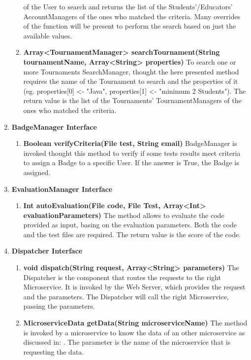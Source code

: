 \begin{enumerate}
\begin{enumerate}[label=$\bullet$]
            of the User to search and returns the list of the Students'/Educators' AccountManagers of the ones who matched the criteria. Many overrides of the function will be present to perform the search based on just the available values.
            \item \textbf{Array<TournamentManager> searchTournament(String tournamentName, Array<String> properties)} To search one or more Tournaments SearchManager, thought the here presented method requires the name of the Tournament 
            to search and the properties of it (eg. properties[0] <- "Java", properties[1] <- "minimum 2 Students"). The return value is the list of the Tournaments' TournamentManagers of the ones who matched the criteria.
        \end{enumerate}
    \item \textbf{BadgeManager Interface}
        \begin{enumerate}[label=$\bullet$]
            \item \textbf{Boolean verifyCriteria(File test, String email)} BadgeManager is invoked thought this method to verify if some tests results meet criteria to assign a Badge to a specific User. If the answer is True, the Badge
            is assigned.
        \end{enumerate}
    \item \textbf{EvaluationManager Interface}
        \begin{enumerate}[label=$\bullet$]
            \item \textbf{Int autoEvaluation(File code, File Test, Array<Int> evaluationParameters)} The method allows to evaluate the code provided as input, basing on the evaluation parameters. Both the code and the test files are
            required. The return value is the score of the code.
        \end{enumerate}
    \item \textbf{Dispatcher Interface}
        \begin{enumerate}[label=$\bullet$]
            \item \textbf{void dispatch(String request, Array<String> parameters)} The Dispatcher is the component that routes the requests to the right Microservice. It is invoked by the Web Server, which provides the request and the 
            parameters. The Dispatcher will call the right Microservice, passing the parameters.
            \item \textbf{MicroserviceData getData(String microserviceName)} \label{meth:dispGetData}The method is invoked by a microservice to know the data of an other microservice as discussed in: . The parameter is the name of the microservice that is requesting the data.
        \end{enumerate}
\end{enumerate}
